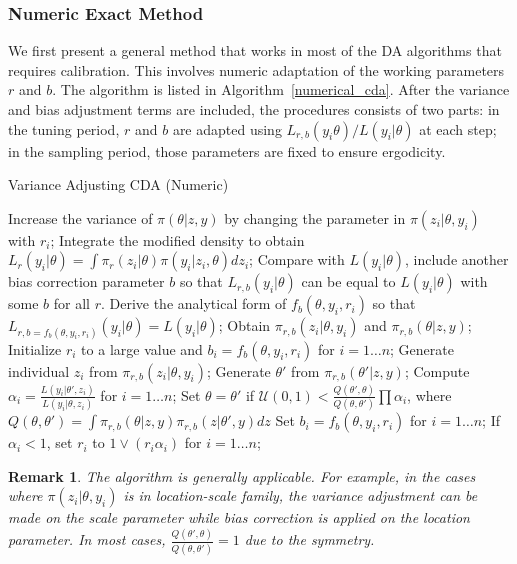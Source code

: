 \documentclass[10pt]{article}
\newtheorem{remark}{Remark}
\begin{document}
\subsubsection{Numeric Exact Method}

We first present a general method that works in most of the DA algorithms that requires calibration. This involves numeric adaptation of the working parameters $r$ and $b$. The algorithm is listed in Algorithm~\ref{numerical_cda}. After the variance and bias adjustment terms are included, the procedures consists of two parts: in the tuning period, $r$ and $b$ are adapted using $L_{r,b}(y_i\theta)/L(y_i|\theta)$ at each step; in the sampling period, those parameters are fixed to ensure ergodicity.
 
 
\begin{algorithm}[H]
		\caption{Variance Adjusting CDA (Numeric)}
		\label{numerical_cda}
		    \begin{algorithmic}
		\State Increase the variance of $\pi(\theta| z,y)$ by changing the parameter in $\pi(z_i |\theta,y_i)$ with $r_i$;
		\State Integrate the modified density to obtain $L_r(y_i|\theta)= \int \pi_r (z_i|\theta) \pi(y_i|z_i,\theta) d z_i$; 
		\State Compare with $L(y_i|\theta)$, include another bias correction parameter $b$ so that $L_{r,b}(y_i|\theta)$ can be equal to $L(y_i|\theta)$ with some $b$ for all $r$.
		\State Derive the analytical form of $f_b(\theta,y_i,r_i)$ so that $L_{r,b={f_b(\theta,y_i,r_i)}}(y_i|\theta)=L(y_i|\theta)$;
		\State Obtain $\pi_{r,b}(z_i|\theta, y_i)$ and  $\pi_{r,b}(\theta| z, y)$;
		\State Initialize $r_i$ to a large value and $b_i= f_b(\theta,y_i, r_i)$  for $i=1\ldots n$;
		\State {}
		\State Generate individual $z_i$ from $\pi_{r,b}(z_i|\theta, y_i)$;
		\State Generate $\theta'$ from $\pi_{r,b}(\theta'|z, y)$;
		\State Compute $\alpha_i = \frac{L( y_i|\theta', z_i ) }{L( y_i|\theta, z_i )}$  for $i=1\ldots n$;
		\State Set $\theta=\theta'$ if $\mathcal{U}(0,1)< \frac{Q(\theta',\theta)}{Q(\theta,\theta')}\prod \alpha_i$, where $Q(\theta,\theta') = \int  \pi_{r,b}(\theta| z, y) \pi_{r,b}(z|\theta', y)d z$
		\State {}
			\State Set $b_i= f_b(\theta,y_i, r_i)$ for $i=1\ldots n$;
			\State If $\alpha_i<1$, set $r_i$ to $1 \vee (r_i \alpha_i)$  for $i=1\ldots n$;
		\EndIf
		\EndFor
		\end{algorithmic}
\end{algorithm}

\begin{remark}
The algorithm is generally applicable. For example, in the cases where $\pi(z_i | \theta,y_i)$ is in location-scale family, the variance adjustment can be made on the scale parameter while bias correction is applied on the location parameter. In most cases, $\frac{Q(\theta',\theta)}{Q(\theta,\theta')}=1$ due to the symmetry.
\end{remark}
\end{document}
